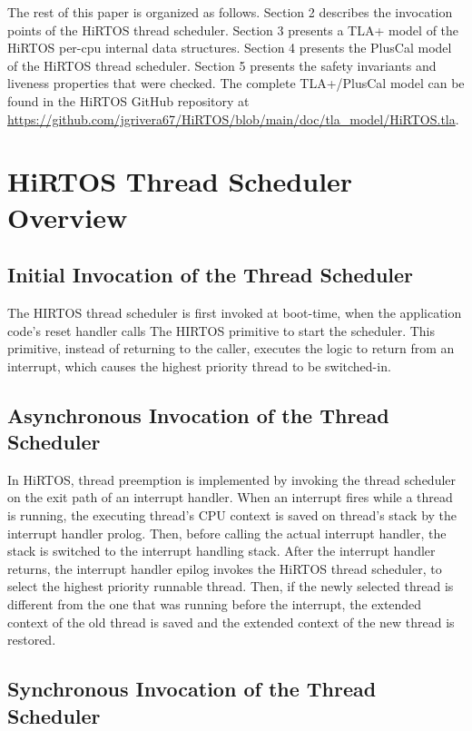 \documentclass[sigplan,anonymous,10pt]{acmart}
\begin{document}
The rest of this paper is organized as follows. Section 2 describes the invocation points
of the HiRTOS thread scheduler.
Section 3 presents a TLA+ model of the HiRTOS per-cpu internal data structures.
Section 4 presents the PlusCal model of the HiRTOS thread scheduler.
Section 5 presents the safety invariants and liveness properties that were checked.
The complete TLA+/PlusCal model can be
found in the HiRTOS GitHub repository at \url{https://github.com/jgrivera67/HiRTOS/blob/main/doc/tla_model/HiRTOS.tla}.

\section{HiRTOS Thread Scheduler Overview}

\subsection{Initial Invocation of the Thread Scheduler}

The HIRTOS thread scheduler is first invoked at boot-time, when the application code's
reset handler calls The HIRTOS primitive to start the scheduler. This primitive,
instead of returning to the caller, executes the logic to return from an interrupt,
which causes the highest priority thread to be switched-in.

\subsection{Asynchronous Invocation of the Thread Scheduler}

In HiRTOS, thread preemption is implemented by invoking the thread scheduler
on the exit path of an interrupt handler. When an interrupt fires while
a thread is running, the executing thread's CPU context is saved
on thread's stack by the interrupt handler prolog. Then, before calling the
actual interrupt handler, the stack is switched to the interrupt handling stack.
After the interrupt handler returns, the interrupt handler epilog invokes
the HiRTOS thread scheduler, to select the highest priority runnable thread.
Then, if the newly selected thread is different from  the one that was running before
the interrupt, the extended context of the old thread is saved and the extended
context of the new thread is restored.

\subsection{Synchronous Invocation of the Thread Scheduler}
\end{document}
